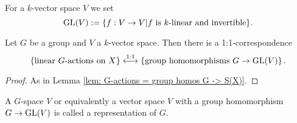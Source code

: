 For a $k$-vector space $V$ we set
\[
 \operatorname{GL}(V) := \{f : V \to V | f \text{ is $k$-linear and invertible}\}.
\]


\begin{lem}
 Let $G$ be a group and $V$ a $k$-vector space. Then there is a 1:1-correspondence
 \[
    \left\{\text{linear $G$-actions on $X$}\right\}
  \overset{1:1}{\longleftrightarrow}
  \left\{\text{group homomorphisms $G \to \operatorname{GL}(V)$}\right\}.
 \]
\end{lem}
\begin{proof}
 As in Lemma \ref{lem: G-actions = group homos G -> S(X)}.
\end{proof}


\begin{rem}
 A $G$-space $V$ or equivalently a vector space $V$ with a group homomorphism $G \to \operatorname{GL}(V)$ is called a representation of $G$.
\end{rem}



